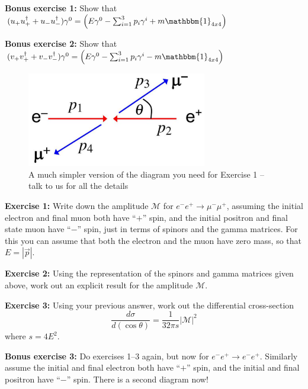 \documentclass[a4paper,11pt]{article}
\numberwithin{equation}{section} %
\begin{document}
\textbf{Bonus exercise 1:} Show that $(u_+ u_+^\dagger + u_- u_-^\dagger) \gamma^0 = \left( E \gamma^0  - \sum_{i=1}^{3} p_i \gamma^i + m \mathbbm{1}_{4x4} \right)$

\textbf{Bonus exercise 2:} Show that $(v_+ v_+^\dagger + v_- v_-^\dagger) \gamma^0 = \left( E \gamma^0  - \sum_{i=1}^{3} p_i \gamma^i - m \mathbbm{1}_{4x4} \right)$

\begin{figure}
\begin{center}
\includegraphics[width=0.7\textwidth]{scattering.png}
\end{center}
\caption{A much simpler version of the diagram you need for Exercise 1 -- talk to us for all the details}
\end{figure}



\textbf{Exercise 1:} Write down the amplitude $\mathcal{M}$ for $e^- e^+ \to \mu^- \mu^+$, assuming the initial electron and final muon both have ``$+$'' spin, and the initial positron and final state muon have ``$-$'' spin, just in terms of spinors and the gamma matrices.
For this you can assume that both the electron and the muon have zero mass, so that $E = |\overrightarrow{p}|$.

\textbf{Exercise 2:} Using the representation of the spinors and gamma matrices given above, work out an explicit result for the amplitude $\mathcal{M}$.

\textbf{Exercise 3:} Using your previous answer, work out the differential cross-section
\begin{equation}
\frac{d \sigma}{d (\cos \theta)} = \frac{1}{32 \pi s} |\mathcal{M}|^2
\end{equation}
where $s = 4 E^2$.

\textbf{Bonus exercise 3:} Do exercises 1--3 again, but now for $e^- e^+ \to e^- e^+$. Similarly assume the initial and final electron both have ``$+$'' spin, and the initial and final positron have ``$-$'' spin. There is a second diagram now!
\end{document}
